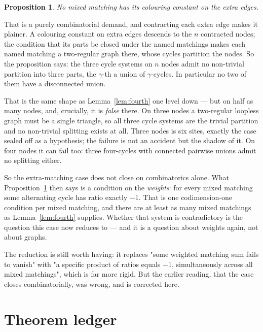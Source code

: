 \documentclass[11pt]{article}
\newtheorem{proposition}[theorem]{Proposition}
\theoremstyle{definition}
\theoremstyle{remark}
\begin{document}
\begin{proposition}\label{prop:noconst}
No mixed matching has its colouring constant on the extra edges.
\end{proposition}

That is a purely combinatorial demand, and contracting each extra edge makes it plainer.
A colouring constant on extra edges descends to the $n$ contracted nodes; the condition
that its parts be closed under the named matchings makes each named matching a
two-regular graph there, whose cycles partition the nodes. So the proposition says: the
three cycle systems on $n$ nodes admit no non-trivial partition into three parts, the
$\gamma$-th a union of $\gamma$-cycles. In particular no two of them have a disconnected
union.

That is the same shape as Lemma~\ref{lem:fourth} one level down --- but on half as many
nodes, and, crucially, it is \emph{false} there. On three nodes a two-regular loopless
graph must be a single triangle, so all three cycle systems are the trivial partition and
no non-trivial splitting exists at all. Three nodes is six sites, exactly the case sealed
off as a hypothesis; the failure is not an accident but the shadow of it. On four nodes it
can fail too: three four-cycles with connected pairwise unions admit no splitting either.

So the extra-matching case does not close on combinatorics alone. What
Proposition~\ref{prop:noconst} then says is a condition on the \emph{weights}: for every
mixed matching some alternating cycle has ratio exactly $-1$. That is one codimension-one
condition per mixed matching, and there are at least as many mixed matchings as
Lemma~\ref{lem:fourth} supplies. Whether that system is contradictory is the question this
case now reduces to --- and it is a question about weights again, not about graphs.

The reduction is still worth having: it replaces "some weighted matching sum fails to
vanish" with "a specific product of ratios equals $-1$, simultaneously across all mixed
matchings", which is far more rigid. But the earlier reading, that the case closes
combinatorially, was wrong, and is corrected here.\section{Theorem ledger}\label{sec:ledger}
\end{document}
